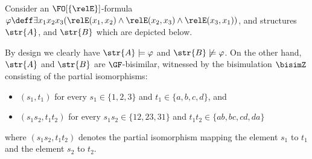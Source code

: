 \begin{example}
  Consider an $\FO[\{\relE\}]$-formula $\varphi \deff \exists{x_{1}x_{2}x_{3}}(\relE(x_{1}, x_{2}) \land \relE(x_{2}, x_{3}) \land \relE(x_{3}, x_{1}))$, and structures $\str{A}$, and $\str{B}$ which are depicted below.
  \begin{figure}[H]
  \centering
  \vspace{-0.2em}
  \end{figure}
  \vspace{-0.5em}
  \noindent
  By design we clearly have $\str{A}\models \varphi$ and $\str{B} \not\models \varphi$. On the other hand, $\str{A}$ and $\str{B}$ are $\GF$-bisimilar, witnessed by the bisimulation $\bisimZ$ consisting of the partial isomorphisms:
  \begin{itemize}
    \item $(s_{1}, t_{1})$ for every $s_{1} \in \{1,2,3\}$ and $t_{1} \in \{a,b,c,d\}$, and
    \item $(s_{1}s_{2}, t_{1}t_{2})$ for every $s_{1}s_{2} \in \{12,23,31\}$ and $t_{1}t_{2} \in \{ab,bc,cd,da\}$
  \end{itemize}
  where $(s_{1}s_{2}, t_{1}t_{2})$ denotes the partial isomorphism mapping the element $s_{1}$ to $t_{1}$ and the element $s_{2}$ to $t_{2}$.
\end{example}

\clearpage

